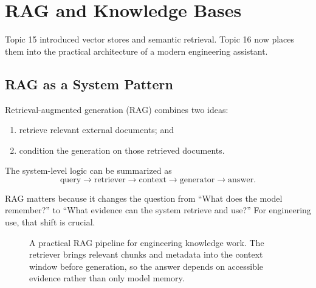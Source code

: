 \documentclass[12pt]{article}
\begin{document}
\section{RAG and Knowledge Bases}

Topic 15 introduced vector stores and semantic retrieval. Topic 16 now places them into the practical architecture of a modern engineering assistant.

\subsection{RAG as a System Pattern}

Retrieval-augmented generation (RAG) combines two ideas:
\begin{enumerate}
    \item retrieve relevant external documents; and
    \item condition the generation on those retrieved documents.
\end{enumerate}

The system-level logic can be summarized as
\begin{equation}
    \text{query} \rightarrow \text{retriever} \rightarrow \text{context} \rightarrow \text{generator} \rightarrow \text{answer}.
    \label{t16eq:rag}
\end{equation}

RAG matters because it changes the question from ``What does the model remember?'' to ``What evidence can the system retrieve and use?'' For engineering use, that shift is crucial.

\begin{figure}[ht]
    \centering
    \caption{A practical RAG pipeline for engineering knowledge work. The retriever brings relevant chunks and metadata into the context window before generation, so the answer depends on accessible evidence rather than only model memory.}
    \label{t16fig:rag}
\end{figure}
\end{document}
